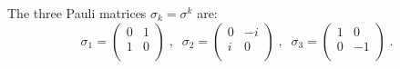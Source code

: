 \documentclass[final,5p,times,twocolumn]{elsarticle}
\begin{document}
The three Pauli matrices $\sigma_k = \sigma^k$ are:
\begin{equation*}
 \sigma_1
 =
 \left(\begin{array}{cc}
  0 & 1 \\
  1 & 0 \\
 \end{array}\right)
 \;, \;\;
 \sigma_2
 =
 \left(\begin{array}{cc}
  0 & -i \\
  i & 0 \\
 \end{array}\right)
 \;, \;\;
 \sigma_3
 =
 \left(\begin{array}{cc}
  1 & 0 \\
  0 & -1 \\
 \end{array}\right) \;.
\end{equation*}
\end{document}
